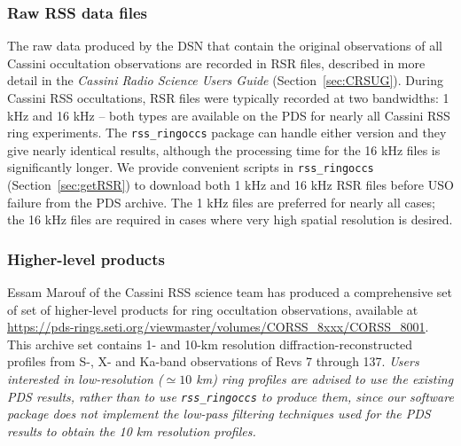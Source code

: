 \documentclass[titlepage, 12pt]{article}
\begin{document}
            \subsubsection{Raw RSS data files}
                \label{sec:rawRSSfiles}
                The raw data  produced by the DSN that contain
                the original observations of all Cassini
                occultation observations are recorded in
                RSR files, described in more detail in the
                \textit{Cassini Radio Science Users Guide}
                (Section~\ref{sec:CRSUG}).
                During Cassini RSS occultations,
                RSR files were typically recorded at two
                bandwidths: 1 kHz and 16 kHz -- both types are available on the PDS for nearly all Cassini RSS ring experiments.
                The \texttt{rss\_ringoccs}
                package can handle either version
                and they give nearly identical results,
                although the processing time for the
                16 kHz files is significantly longer.
                We provide convenient scripts in
                \texttt{rss\_ringoccs}
                (Section~\ref{sec:getRSR})
                to download both 1 kHz and 16 kHz RSR files before USO failure
                from the PDS archive. The 1 kHz files are preferred for nearly all
                cases; the 16 kHz files are required in cases where very high spatial
                resolution is desired.
            \subsubsection{Higher-level products}\label{sec:pdsproducts}
                Essam Marouf of the Cassini RSS science
                team has produced a comprehensive set of
                set of higher-level products for
                ring occultation observations, available at
                \url{https://pds-rings.seti.org/viewmaster/volumes/CORSS_8xxx/CORSS_8001}.
                This archive set contains 1- and 10-km resolution
                diffraction-reconstructed profiles
                from S-, X- and Ka-band observations
                of Revs 7 through 137. \textit{Users interested in low-resolution ($\simeq 10$ km)
                ring profiles are advised to use the existing PDS results, rather than to use \texttt{rss\_ringoccs} to produce them, since our software package does not implement the low-pass filtering techniques used for the PDS results to obtain the 10 km resolution profiles.}
                 \par\hfill\par
\end{document}

